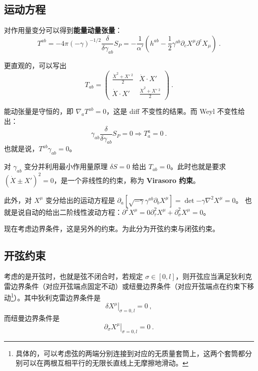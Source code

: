 

\subsection{运动方程}
对作用量变分可以得到\textbf{能量动量张量}：
\begin{equation}
	T^{ab} = - 4\pi (- \gamma)^{-1/2} \frac{\delta}{\delta \gamma_{ab}} S_P = -\frac{1}{\alpha'} (h^{ab} - \frac{1}{2} \gamma^{ab} \partial_c X^\mu \partial^c X_\mu) ~.
\end{equation}

更直观的，可以写出 
\begin{equation}
	T_{ab} = \left(\begin{matrix}
		\frac{\dot X^2 + X'~^2}{2} & \dot X \cdot X' \\
		\dot X \cdot X' & \frac{\dot X^2 + X'~^2}{2}
	\end{matrix}\right) ~.
\end{equation}

能动张量是守恒的，即 $\nabla_a T^{ab} = 0$，这是 diff 不变性的结果。而 Weyl 不变性给出：
\begin{equation}
	\gamma_{ab} \frac{\delta}{\delta \gamma_{ab}} S_P = 0 \Rightarrow T_a^a = 0 ~.
\end{equation}
也就是说，$T^{ab} \gamma_{ab} = 0$。

对 $\gamma_{ab}$ 变分并利用最小作用量原理 $\delta S = 0$ 给出 $T_{ab} = 0$。此时也就是要求 $(\dot X \pm X')^2 = 0$，是一个非线性的约束，称为\textbf{ Virasoro 约束}。

此外，对 $X^\mu$ 变分给出的运动方程是 $\partial_a [\sqrt{-\gamma} \gamma^{ab} \partial_b X^\mu] = \det{-\gamma} \nabla^2 X^\mu = 0$。 也就是说自动的给出二阶线性波动方程：$\partial^2 X^\mu = 0\partial_\tau^2 X^\mu + \partial_\sigma^2 X^\mu = 0$。

现在考虑边界条件，这是另外的约束。为此分为开弦约束与闭弦约束。

\subsection{开弦约束}
考虑的是开弦时，也就是弦不闭合时，若规定 $\sigma \in [0, l]$，则开弦应当满足狄利克雷边界条件（对应开弦端点固定不动）或纽曼边界条件（对应开弦端点在约束下移动\footnote{具体的，可以考虑弦的两端分别连接到对应的无质量套筒上，这两个套筒都分别可以在两根互相平行的无限长直线上无摩擦地滑动。}）。其中狄利克雷边界条件是 
\begin{equation}
	\left. \delta X^\mu \right|_{\sigma = 0, l} = 0~,
\end{equation}
而纽曼边界条件是 
\begin{equation}
	\left. \partial_\sigma X^\mu \right|_{\sigma = 0, l} = 0 ~.
\end{equation}

